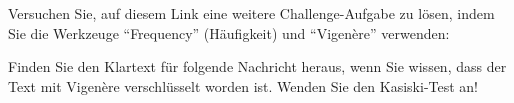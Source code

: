 \begin{myexercise}
\begin{myanswer}
\end{myanswer}
\end{myexercise}
\begin{mychallenge}
Versuchen Sie, auf diesem Link eine weitere Challenge-Aufgabe zu lösen, indem Sie die Werkzeuge \enquote{Frequency} (Häufigkeit) und \enquote{Vigenère} verwenden:

\end{mychallenge}
\clearpage

\begin{myexercise}
Finden Sie den Klartext für folgende Nachricht heraus, wenn Sie wissen, dass der Text mit Vigenère verschlüsselt worden ist. Wenden Sie den Kasiski-Test an! 



\end{myexercise}
